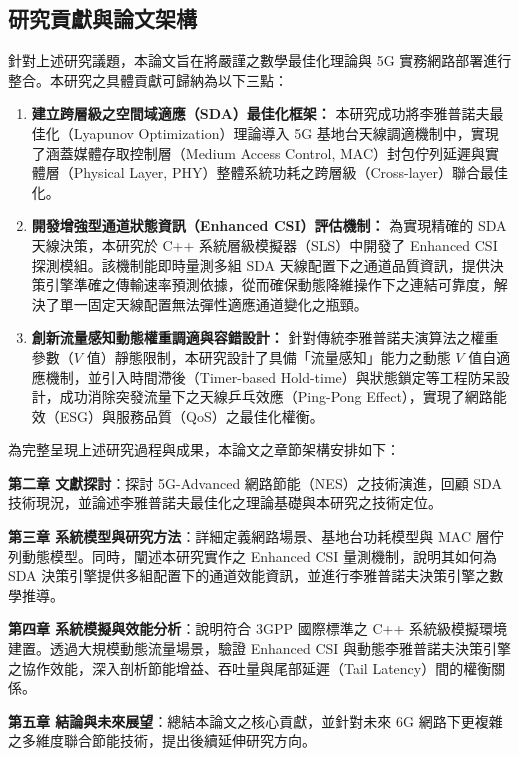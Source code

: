\subsection{研究貢獻與論文架構}

針對上述研究議題，本論文旨在將嚴謹之數學最佳化理論與 5G 實務網路部署進行整合。本研究之具體貢獻可歸納為以下三點：
\begin{enumerate}
    \item \textbf{建立跨層級之空間域適應（SDA）最佳化框架：} 本研究成功將李雅普諾夫最佳化（Lyapunov Optimization）理論導入 5G 基地台天線調適機制中，實現了涵蓋媒體存取控制層（Medium Access Control, MAC）封包佇列延遲與實體層（Physical Layer, PHY）整體系統功耗之跨層級（Cross-layer）聯合最佳化。
    \item \textbf{開發增強型通道狀態資訊（Enhanced CSI）評估機制：} 為實現精確的 SDA 天線決策，本研究於 C++ 系統層級模擬器（SLS）中開發了 Enhanced CSI 探測模組。該機制能即時量測多組 SDA 天線配置下之通道品質資訊，提供決策引擎準確之傳輸速率預測依據，從而確保動態降維操作下之連結可靠度，解決了單一固定天線配置無法彈性適應通道變化之瓶頸。
    \item \textbf{創新流量感知動態權重調適與容錯設計：} 針對傳統李雅普諾夫演算法之權重參數（$V$ 值）靜態限制，本研究設計了具備「流量感知」能力之動態 $V$ 值自適應機制，並引入時間滯後（Timer-based Hold-time）與狀態鎖定等工程防呆設計，成功消除突發流量下之天線乒乓效應（Ping-Pong Effect），實現了網路能效（ESG）與服務品質（QoS）之最佳化權衡。
\end{enumerate}

為完整呈現上述研究過程與成果，本論文之章節架構安排如下：

\textbf{第二章 文獻探討}：探討 5G-Advanced 網路節能（NES）之技術演進，回顧 SDA 技術現況，並論述李雅普諾夫最佳化之理論基礎與本研究之技術定位。

\textbf{第三章 系統模型與研究方法}：詳細定義網路場景、基地台功耗模型與 MAC 層佇列動態模型。同時，闡述本研究實作之 Enhanced CSI 量測機制，說明其如何為 SDA 決策引擎提供多組配置下的通道效能資訊，並進行李雅普諾夫決策引擎之數學推導。

\textbf{第四章 系統模擬與效能分析}：說明符合 3GPP 國際標準之 C++ 系統級模擬環境建置。透過大規模動態流量場景，驗證 Enhanced CSI 與動態李雅普諾夫決策引擎之協作效能，深入剖析節能增益、吞吐量與尾部延遲（Tail Latency）間的權衡關係。

\textbf{第五章 結論與未來展望}：總結本論文之核心貢獻，並針對未來 6G 網路下更複雜之多維度聯合節能技術，提出後續延伸研究方向。